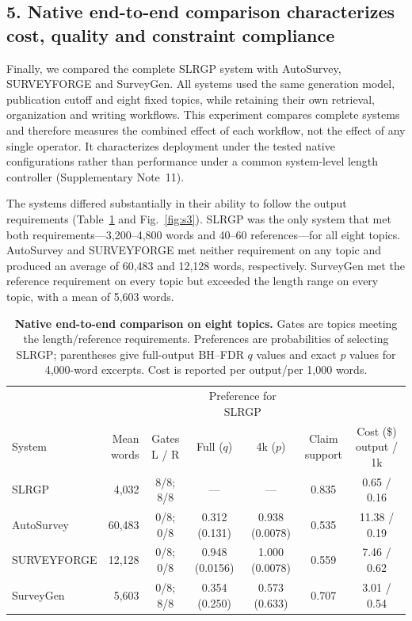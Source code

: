 \documentclass[11pt,a4paper]{article}
\begin{document}
\subsection*{5. Native end-to-end comparison characterizes cost, quality and constraint compliance}

Finally, we compared the complete SLRGP system with AutoSurvey\cite{autosurvey}, SURVEYFORGE\cite{surveyforge} and SurveyGen\cite{surveygen}. All systems used the same generation model, publication cutoff and eight fixed topics, while retaining their own retrieval, organization and writing workflows. This experiment compares complete systems and therefore measures the combined effect of each workflow, not the effect of any single operator. It characterizes deployment under the tested native configurations rather than performance under a common system-level length controller (Supplementary Note~11).

The systems differed substantially in their ability to follow the output requirements (Table~\ref{tab:s3} and Fig.~\ref{fig:s3}). SLRGP was the only system that met both requirements---3,200--4,800 words and 40--60 references---for all eight topics. AutoSurvey and SURVEYFORGE met neither requirement on any topic and produced an average of 60,483 and 12,128 words, respectively. SurveyGen met the reference requirement on every topic but exceeded the length range on every topic, with a mean of 5,603 words.

\begin{table}[!htbp]
\caption{\textbf{Native end-to-end comparison on eight topics.} Gates are topics meeting the length/reference requirements. Preferences are probabilities of selecting SLRGP; parentheses give full-output BH--FDR $q$ values and exact $p$ values for 4,000-word excerpts. Cost is reported per output/per 1,000 words.}
\label{tab:s3}
\centering
\footnotesize
\setlength{\tabcolsep}{2.75pt}
\renewcommand{\arraystretch}{1.0}
\begin{tabular}{@{}lrccccc@{}}
\toprule
 & & & \multicolumn{2}{c}{Preference for SLRGP} & & \\[-10pt]
System & \shortstack{Mean\\words} & \shortstack{Gates\\L / R} & Full ($q$) & 4k ($p$) & \shortstack{Claim\\support} & \shortstack{Cost (\$)\\output / 1k} \\
\midrule
SLRGP & 4,032 & 8/8; 8/8 & --- & --- & 0.835 & 0.65 / 0.16 \\
AutoSurvey & 60,483 & 0/8; 0/8 & 0.312 (0.131) & 0.938 (0.0078) & 0.535 & 11.38 / 0.19 \\
SURVEYFORGE & 12,128 & 0/8; 0/8 & 0.948 (0.0156) & 1.000 (0.0078) & 0.559 & 7.46 / 0.62 \\
SurveyGen & 5,603 & 0/8; 8/8 & 0.354 (0.250) & 0.573 (0.633) & 0.707 & 3.01 / 0.54 \\
\bottomrule
\end{tabular}
\end{table}
\end{document}
